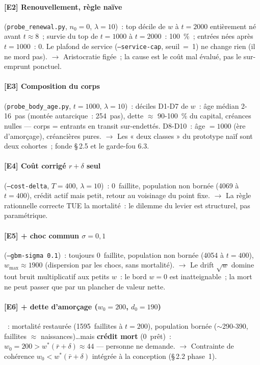 \documentclass[11pt,a4paper]{article}
\begin{document}
\paragraph{[E2] Renouvellement, règle naïve} (\texttt{probe_renewal.py}, $n_0=0$, $\lambda=10$)~: top décile de $w$ à $t=2000$ entièrement né avant $t\approx 8$~; survie du top de $t=1000$ à $t=2000$~: 100~\%~; entrées nées après $t=1000$~: 0. Le plafond de service (\texttt{--service-cap}, seuil~=~1) ne change rien (il ne mord pas). $\to$ Aristocratie figée~; la cause est le coût mal évalué, pas le sur-emprunt ponctuel.

\paragraph{[E3] Composition du corps} (\texttt{probe_body_age.py}, $t=1000$, $\lambda=10$)~: déciles D1-D7 de $w$~: âge médian 2-16~pas (montée autarcique~: 254~pas), dette $\approx$ 90-100~\% du capital, créances nulles --- corps = entrants en transit sur-endettés. D8-D10~: âge $=1000$ (ère d'amorçage), créancières pures. $\to$ Les « deux classes » du prototype naïf sont deux cohortes~; fonde \S\,2.5 et le garde-fou 6.3.

\paragraph{[E4] Coût corrigé $r+\delta$ seul} (\texttt{--cost-delta}, $T=400$, $\lambda=10$)~: 0~faillite, population non bornée (4069 à $t=400$), crédit actif mais petit, retour au voisinage du point fixe. $\to$ La règle rationnelle correcte TUE la mortalité~: le dilemme du levier est structurel, pas paramétrique.

\paragraph{[E5] + choc commun $\sigma=0{,}1$} (\texttt{--gbm-sigma 0.1})~: toujours 0~faillite, population non bornée (4054 à $t=400$), $w_{\max}\approx 1900$ (dispersion par les chocs, sans mortalité). $\to$ Le drift $\sqrt{w}$ domine tout bruit multiplicatif aux petits $w$~: le bord $w=0$ est inatteignable~; la mort ne peut passer que par un plancher de valeur nette.

\paragraph{[E6] + dette d'amorçage ($w_0=200$, $d_0=190$)}~: mortalité restaurée (1595~faillites à $t=200$), population bornée ($\sim$290-390, faillites $\approx$ naissances)\ldots mais \textbf{crédit mort} (0~prêt)~: $w_0=200 > w^*(\bar r+\delta)\approx 44$ --- personne ne demande. $\to$ Contrainte de cohérence $w_0<w^*(\bar r+\delta)$ intégrée à la conception (\S\,2.2 phase~1).
\end{document}
